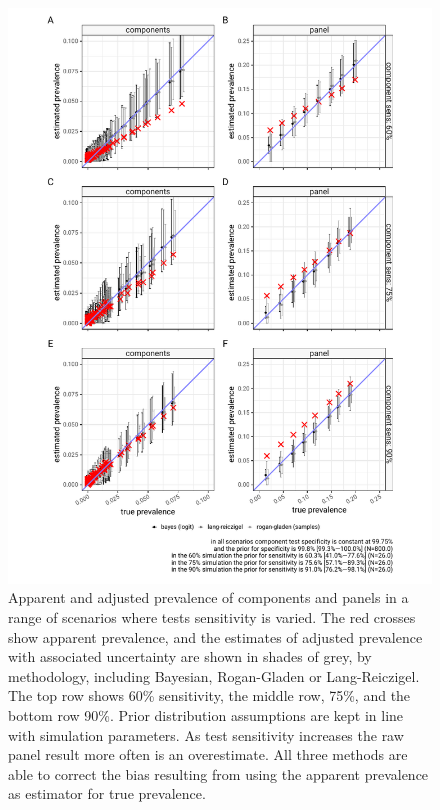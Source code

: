\documentclass[a4paper, 12pt, twoside]{article}
\begin{document}
\begin{figure}[h!]
\centering
  \includegraphics{fig/simulation_result_same_sens_v2}
  \caption{Apparent and adjusted prevalence of components and panels in a range of scenarios where tests sensitivity is varied. The red crosses show apparent prevalence, and the estimates of adjusted prevalence with associated uncertainty are shown in shades of grey, by methodology, including Bayesian, Rogan-Gladen or Lang-Reiczigel. The top row shows 60\% sensitivity, the middle row, 75\%, and the bottom row 90\%. Prior distribution assumptions are kept in line with simulation parameters. As test sensitivity increases the raw panel result more often is an overestimate. All three methods are able to correct the bias resulting from using the apparent prevalence as estimator for true prevalence.}
\label{fig:B4}
\end{figure}
\end{document}

